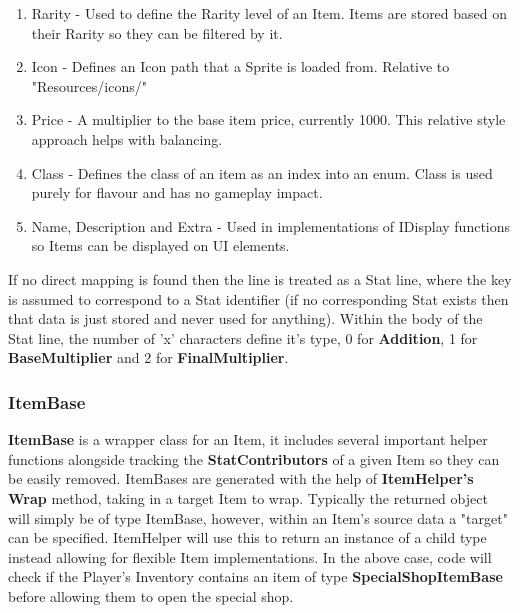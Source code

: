 \documentclass{report}
\begin{document}
\begin{enumerate}

	\item Rarity - Used to define the Rarity level of an Item. Items are stored based on their Rarity so they can be filtered by it.

	\item Icon - Defines an Icon path that a Sprite is loaded from. Relative to "Resources/icons/"

	\item Price - A multiplier to the base item price, currently 1000. This relative style approach helps with balancing.

	\item Class - Defines the class of an item as an index into an enum. Class is used purely for flavour and has no gameplay impact.

	\item Name, Description and Extra - Used in implementations of IDisplay functions so Items can be displayed on UI elements.

\end{enumerate}

If no direct mapping is found then the line is treated as a Stat line, where the key is assumed to correspond to a Stat identifier (if no corresponding Stat exists then that data is just stored and never used for anything). Within the body of the Stat line, the number of 'x' characters define it's type, 0 for \textbf{Addition}, 1 for \textbf{BaseMultiplier} and 2 for \textbf{FinalMultiplier}.

\subsubsection{ItemBase}

\textbf{ItemBase} is a wrapper class for an Item, it includes several important helper functions alongside tracking the \textbf{StatContributors} of a given Item so they can be easily removed. ItemBases are generated with the help of \textbf{ItemHelper's} \textbf{Wrap} method, taking in a target Item to wrap. Typically the returned object will simply be of type ItemBase, however, within an Item's source data a "target" can be specified. ItemHelper will use this to return an instance of a child type instead allowing for flexible Item implementations. In the above case, code will check if the Player's Inventory contains an item of type \textbf{SpecialShopItemBase} before allowing them to open the special shop.
\end{document}
